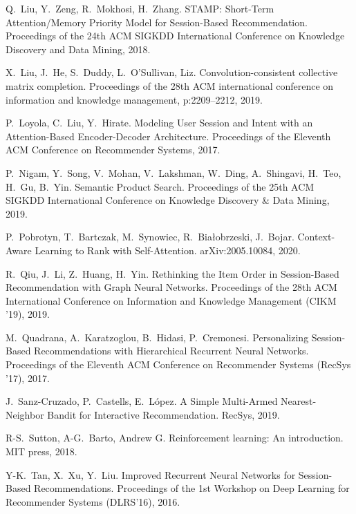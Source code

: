 \documentclass[11pt, dvipdfmx]{article}
\begin{document}
\begin{thebibliography}{10}
\begin{small}
 Q.~Liu, Y.~Zeng, R.~Mokhosi, H.~Zhang.
\newblock STAMP: Short-Term Attention/Memory Priority Model for Session-Based Recommendation. \newblock Proceedings of the 24th ACM SIGKDD International Conference on Knowledge Discovery and Data Mining, 2018.

 X.~Liu, J.~He, S.~Duddy, L.~O'Sullivan, Liz.
\newblock Convolution-consistent collective matrix completion.
\newblock Proceedings of the 28th ACM international conference on information and knowledge management, p:2209--2212, 2019.

 P.~Loyola, C.~Liu, Y.~Hirate.
\newblock Modeling User Session and Intent with an Attention-Based Encoder-Decoder Architecture. 
\newblock Proceedings of the Eleventh ACM Conference on Recommender Systems, 2017.

 P.~Nigam, Y.~Song, V.~Mohan, V.~Lakshman, W.~Ding, A.~Shingavi, H.~Teo, H.~Gu, B.~Yin. \newblock Semantic Product Search. \newblock Proceedings of the 25th ACM SIGKDD International Conference on Knowledge Discovery \& Data Mining, 2019.

 P.~Pobrotyn, T.~Bartczak, M.~Synowiec, R.~Białobrzeski, J.~Bojar.
\newblock Context-Aware Learning to Rank with Self-Attention. 
\newblock arXiv:2005.10084, 2020.

R.~Qiu, J.~Li, Z.~Huang, H.~Yin.
\newblock Rethinking the Item Order in Session-Based Recommendation with Graph Neural Networks.
\newblock Proceedings of the 28th ACM International Conference on Information and Knowledge Management (CIKM ’19), 2019.

M.~Quadrana, A.~Karatzoglou, B.~Hidasi, P.~Cremonesi.
\newblock Personalizing Session-Based Recommendations with Hierarchical Recurrent Neural Networks.
\newblock Proceedings of the Eleventh ACM Conference on Recommender Systems (RecSys '17), 2017.

 J.~Sanz-Cruzado, P.~Castells, E.~L\'{o}pez.
\newblock A Simple Multi-Armed Nearest-Neighbor Bandit for Interactive Recommendation.
\newblock RecSys, 2019. 

 R-S.~Sutton, A-G.~Barto, Andrew G.
\newblock Reinforcement learning: An introduction.
\newblock MIT press, 2018.

 Y-K.~Tan, X.~Xu, Y.~Liu.
\newblock Improved Recurrent Neural Networks for Session-Based Recommendations.
\newblock Proceedings of the 1st Workshop on Deep Learning for Recommender Systems (DLRS'16), 2016.


\end{small}
\end{thebibliography}
\end{document}
